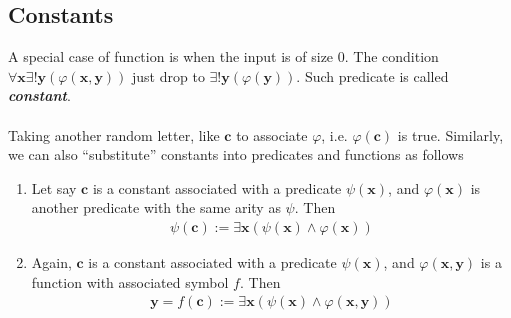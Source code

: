 \documentclass{treatise}
\begin{document}
\begin{shaded}
\subsection{Constants}
A special case of function is when the input is of size $0$. The condition $\forall \mathbf{x} \exists! \mathbf{y} (\varphi(\mathbf{x}, \mathbf{y}))$ just drop to $\exists! \mathbf{y} (\varphi(\mathbf{y}))$. Such predicate is called \textit{\textbf{constant}}.
\\
\\
Taking another random letter, like $\mathbf{c}$ to associate $\varphi$, i.e. $\varphi(\mathbf{c})$ is true. Similarly, we can also ``substitute'' constants into predicates and functions as follows
\begin{enumerate}
    \item Let say $\mathbf{c}$ is a constant associated with a predicate $\psi(\mathbf{x})$, and $\varphi(\mathbf{x})$ is another predicate with the same arity as $\psi$. Then
    \begin{align*}
        \psi(\mathbf{c}) := \exists \mathbf{x} \left( \psi(\mathbf{x}) \wedge \varphi(\mathbf{x}) \right)
    \end{align*}
    \item Again, $\mathbf{c}$ is a constant associated with a predicate $\psi(\mathbf{x})$, and $\varphi(\mathbf{x}, \mathbf{y})$ is a function with associated symbol $f$. Then
    \begin{align*}
        \mathbf{y} = f(\mathbf{c}) := \exists \mathbf{x} \left( \psi(\mathbf{x}) \wedge \varphi(\mathbf{x}, \mathbf{y}) \right)
    \end{align*}
\end{enumerate}
\end{shaded}

\newpage
\newpage
\end{document}
